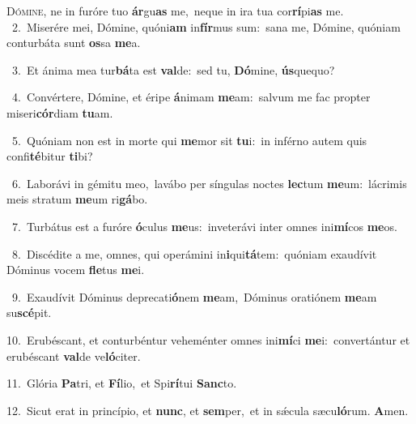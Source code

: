 \lettrine{\initial\textcolor{\initialcolor}{D}}{ómine,} ne in furóre tuo \textbf{ár}\-gu\textbf{as} me,~\star neque in ira tua cor\-\textbf{rí}\-pi\textbf{as} me.\\
{\numbfont\textcolor{\numbcolor}{~2.}}~Miserére mei, Dómine, quóni\textbf{am} in\-\textbf{fír}\-mus sum:~\star sana me, Dómine, quóniam conturbáta sunt \textbf{os}\-sa \textbf{me}\-a.\par
{\numbfont\textcolor{\numbcolor}{~3.}}~Et ánima mea tur\-\textbf{bá}\-ta est \textbf{val}\-de:~\star sed tu, \textbf{Dó}\-mine, \textbf{ús}\-quequo?\par
{\numbfont\textcolor{\numbcolor}{~4.}}~Convértere, Dómine, et éripe \textbf{á}\-nimam \textbf{me}\-am:~\star salvum me fac propter miseri\-\textbf{cór}\-diam \textbf{tu}\-am.\par
{\numbfont\textcolor{\numbcolor}{~5.}}~Quóniam non est in morte qui \textbf{me}\-mor sit \textbf{tu}\-i:~\star in inférno autem quis confi\-\textbf{té}\-bitur \textbf{ti}\-bi?\par
{\numbfont\textcolor{\numbcolor}{~6.}}~Laborávi in gémitu meo,~\dagger lavábo per síngulas noctes \textbf{lec}\-tum \textbf{me}\-um:~\star lácrimis meis stratum \textbf{me}\-um ri\-\textbf{gá}\-bo.\par
{\numbfont\textcolor{\numbcolor}{~7.}}~Turbátus est a furóre \textbf{ó}\-culus \textbf{me}\-us:~\star inveterávi inter omnes ini\-\textbf{mí}\-cos \textbf{me}\-os.\par
{\numbfont\textcolor{\numbcolor}{~8.}}~Discédite a me, omnes, qui operámini in\-\textbf{i}\-qui\-\textbf{tá}\-tem:~\star quóniam exaudívit Dóminus vocem \textbf{fle}\-tus \textbf{me}\-i.\par
{\numbfont\textcolor{\numbcolor}{~9.}}~Exaudívit Dóminus deprecati\-\textbf{ó}\-nem \textbf{me}\-am,~\star Dóminus oratiónem \textbf{me}\-am su\-\textbf{scé}\-pit.\par
{\numbfont\textcolor{\numbcolor}{10.}}~Erubéscant, et conturbéntur veheménter omnes ini\-\textbf{mí}\-ci \textbf{me}\-i:~\star convertántur et erubéscant \textbf{val}\-de ve\-\textbf{ló}\-citer.\par
{\numbfont\textcolor{\numbcolor}{11.}}~Glória \textbf{Pa}\-tri, et \textbf{Fí}\-lio,~\star et Spi\-\textbf{rí}\-tui \textbf{Sanc}\-to.\par
{\numbfont\textcolor{\numbcolor}{12.}}~Sicut erat in princípio, et \textbf{nunc}\-, et \textbf{sem}\-per,~\star et in sǽcula sæcu\-\textbf{ló}\-rum. \textbf{A}\-men.\par
